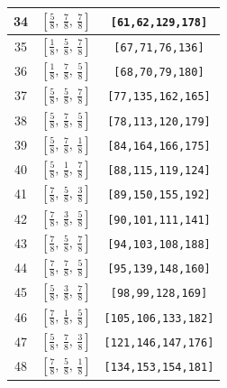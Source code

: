 \documentclass[fleqn,8pt]{jsarticle}
\begin{document}
\begin{longtable}{ccc}
34 & $\left[ \frac{5}{8},\, \frac{7}{8},\, \frac{7}{8} \right]$ & {\tt [61,62,129,178]} \\ \hline
35 & $\left[ \frac{1}{8},\, \frac{5}{8},\, \frac{7}{8} \right]$ & {\tt [67,71,76,136]} \\ \hline
36 & $\left[ \frac{1}{8},\, \frac{7}{8},\, \frac{5}{8} \right]$ & {\tt [68,70,79,180]} \\ \hline
37 & $\left[ \frac{5}{8},\, \frac{5}{8},\, \frac{7}{8} \right]$ & {\tt [77,135,162,165]} \\ \hline
38 & $\left[ \frac{5}{8},\, \frac{7}{8},\, \frac{5}{8} \right]$ & {\tt [78,113,120,179]} \\ \hline
39 & $\left[ \frac{5}{8},\, \frac{7}{8},\, \frac{1}{8} \right]$ & {\tt [84,164,166,175]} \\ \hline
40 & $\left[ \frac{5}{8},\, \frac{1}{8},\, \frac{7}{8} \right]$ & {\tt [88,115,119,124]} \\ \hline
41 & $\left[ \frac{7}{8},\, \frac{5}{8},\, \frac{3}{8} \right]$ & {\tt [89,150,155,192]} \\ \hline
42 & $\left[ \frac{7}{8},\, \frac{3}{8},\, \frac{5}{8} \right]$ & {\tt [90,101,111,141]} \\ \hline
43 & $\left[ \frac{7}{8},\, \frac{5}{8},\, \frac{7}{8} \right]$ & {\tt [94,103,108,188]} \\ \hline
44 & $\left[ \frac{7}{8},\, \frac{7}{8},\, \frac{5}{8} \right]$ & {\tt [95,139,148,160]} \\ \hline
45 & $\left[ \frac{5}{8},\, \frac{3}{8},\, \frac{7}{8} \right]$ & {\tt [98,99,128,169]} \\ \hline
46 & $\left[ \frac{7}{8},\, \frac{1}{8},\, \frac{5}{8} \right]$ & {\tt [105,106,133,182]} \\ \hline
47 & $\left[ \frac{5}{8},\, \frac{7}{8},\, \frac{3}{8} \right]$ & {\tt [121,146,147,176]} \\ \hline
48 & $\left[ \frac{7}{8},\, \frac{5}{8},\, \frac{1}{8} \right]$ & {\tt [134,153,154,181]} \\
\end{longtable}
\renewcommand{\arraystretch}{1.2}
\end{document}
